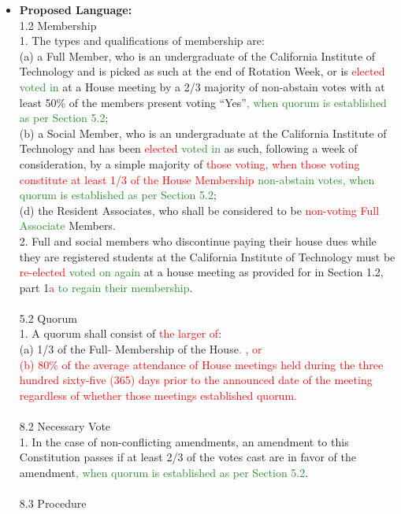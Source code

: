 \documentclass[10pt]{article} %
\newcommand{\add}[1]{\textcolor{ForestGreen}{#1}} %
\newcommand{\del}[1]{\textcolor{red}{#1}} %
\newcommand{\swap}[2]{\del{#1} \add{#2}} %
\begin{document}
\begin{itemize}
    \item \textbf{Proposed Language:} \\
        1.2 Membership \\
        1. The types and qualifications of membership are: \\
        (a) a Full Member, who is an undergraduate of the California Institute of Technology and is picked as such at the end of Rotation Week, or is \swap{elected}{voted in} at a House meeting by a 2/3 majority of non-abstain votes with at least 50\% of the members present voting ``Yes''\add{, when quorum is established as per Section 5.2}; \\
        (b) a Social Member, who is an undergraduate at the California Institute of Technology and has been \swap{elected}{voted in} as such, following a week of consideration, by a simple majority of \swap{those voting, when those voting constitute at least 1/3 of the House Membership}{non-abstain votes, when quorum is established as per Section 5.2}; \\
        (d) the Resident Associates, who shall be considered to be \swap{non-voting Full}{Associate} Members. \\
        2. Full and social members who discontinue paying their house dues while they are registered students at the California Institute of Technology must be \swap{re-elected}{voted on again} at a house meeting as provided for in Section 1.2, part 1\swap{a}{to regain their membership}. \\ \\
        5.2 Quorum \\
        1. A quorum shall consist of \del{the larger of}: \\
        (a) 1/3 of the Full\swap{-}{}Membership of the House\add{.} \del{, or \\
        (b) 80\% of the average attendance of House meetings held during the three hundred sixty-five (365) days prior to the announced date of the meeting regardless of whether those meetings established quorum.} \\ \\
        8.2 Necessary Vote \\
        1. In the case of non-conflicting amendments, an amendment to this Constitution passes if at least 2/3 of the votes cast are in favor of the amendment\add{, when quorum is established as per Section 5.2}. \\ \\
        8.3 Procedure \\

\end{itemize}
\end{document}
